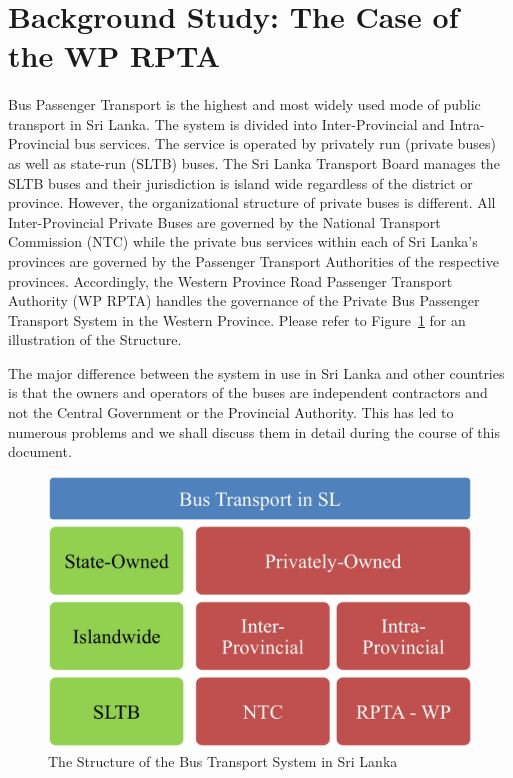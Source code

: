\documentclass[12pt, oneside]{report}
\begin{document}
\newpage

\section{Background Study: The Case of the WP RPTA}
\label{section-BackgroundStudy}

\paragraph{ } Bus Passenger Transport is the highest and most widely used mode of public transport in Sri Lanka. The system is divided into Inter-Provincial and Intra-Provincial bus services. The service is operated by privately run (private buses) as well as state-run (SLTB) buses. The Sri Lanka Transport Board manages the SLTB buses and their jurisdiction is island wide regardless of the district or province. However, the organizational structure of private buses is different. All Inter-Provincial Private Buses are governed by the National Transport Commission (NTC) while the private bus services within each of Sri Lanka’s provinces are governed by the Passenger Transport Authorities of the respective provinces. Accordingly, the Western Province Road Passenger Transport Authority (WP RPTA) handles the governance of the Private Bus Passenger Transport System in the Western Province. Please refer to Figure~\ref{image-busTransportSystemStructure} for an illustration of the Structure.

The major difference between the system in use in Sri Lanka and other countries is that the owners and operators of the buses are independent contractors and not the Central Government or the Provincial Authority. This has led to numerous problems and we shall discuss them in detail during the course of this document.

\begin {figure} [h!]
\centering
\includegraphics [scale=0.6] {busTransportSystemStructure}
\caption [Structure of the Bus Transport System in Sri Lanka] {The Structure of the Bus Transport System in Sri Lanka}
\label {image-busTransportSystemStructure}
\end {figure}
\end{document}

